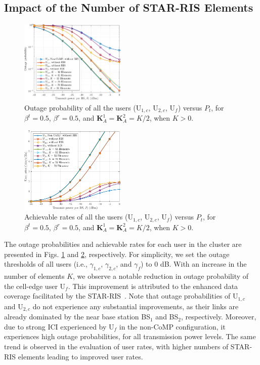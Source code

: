 \documentclass[conference]{IEEEtran}
\begin{document}
\subsection{Impact of the Number of STAR-RIS Elements}
\begin{figure}[t!]
    \centering
    \includegraphics[width=0.45\textwidth]{figs/outage.pdf}
    \caption{Outage probability of all the users ($\text{U}_{1,c}$, $\text{U}_{2,c}$, $\text{U}_f$) versus $P_{t}$, for $\beta^t=0.5$, $\beta^r=0.5$, and $\textbf{K}_A^1=\textbf{K}_A^2=K/2$, when $K>0$.}
    \label{fig:outage}
\end{figure}
\begin{figure}[t!]
    \centering
    \includegraphics[width=0.45\textwidth]{figs/rates.pdf}
    \caption{Achievable rates of all the users ($\text{U}_{1,c}$, $\text{U}_{2,c}$, $\text{U}_f$) versus $P_{t}$, for $\beta^t=0.5$, $\beta^r=0.5$, and $\textbf{K}_A^1=\textbf{K}_A^2=K/2$, when $K>0$.}
    \label{fig:rates}
\end{figure}
The outage probabilities and achievable rates for each user in the cluster are presented in Figs. \ref{fig:outage} and \ref{fig:rates}, respectively. For simplicity, we set the outage thresholds of all users (i.e., $\gamma_{1,c}$, $\gamma_{2,c}$, and $\gamma_f$) to $0$ dB. With an increase in the number of elements $K$, we observe a notable reduction in outage probability of the cell-edge user U$_f$. This improvement is attributed to the enhanced data coverage facilitated by the STAR-RIS~\cite{wang2022outage}. Note that outage probabilities of U$_{1,c}$ and U$_{2,c}$ do not experience any substantial improvements, as their links are already dominated by the near base station BS$_1$ and BS$_2$, respectively. Moreover, due to strong ICI experienced by U$_f$ in the non-CoMP configuration, it experiences high outage probabilities, for all transmission power levels. The same trend is observed in the evaluation of user rates, with higher numbers of STAR-RIS elements leading to improved user rates.
\end{document}
